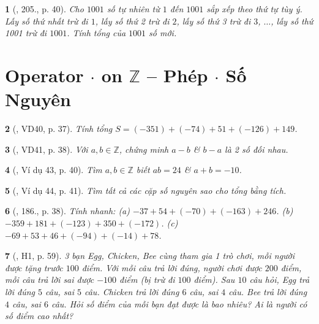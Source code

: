 \documentclass{article}
\newtheorem{baitoan}{}
\begin{document}
\begin{baitoan}[\cite{Tuyen_Toan_6}, 205., p. 40]
	Cho $1001$ số tự nhiên từ $1$ đến $1001$ sắp xếp theo thứ tự tùy ý. Lấy số thứ nhất trừ đi $1$, lấy số thứ 2 trừ đi $2$, lấy số thứ 3 trừ đi $3$, $\ldots$, lấy số thứ 1001 trừ đi $1001$. Tính tổng của $1001$ số mới.
\end{baitoan}


\section{Operator $\cdot$ on $\mathbb{Z}$ -- Phép $\cdot$ Số Nguyên}

\begin{baitoan}[\cite{Tuyen_Toan_6}, VD40, p. 37]
	Tính tổng $S = (-351) + (-74) + 51 + (-126) + 149$.
\end{baitoan}

\begin{baitoan}[\cite{Tuyen_Toan_6}, VD41, p. 38]
	Với $a,b\in\mathbb{Z}$, chứng minh $a - b$ \& $b - a$ là 2 số đối nhau.
\end{baitoan}

\begin{baitoan}[\cite{Tuyen_Toan_6}, Ví dụ 43, p. 40]
	Tìm $a,b\in\mathbb{Z}$ biết $ab = 24$ \& $a + b = -10$.
\end{baitoan}

\begin{baitoan}[\cite{Tuyen_Toan_6}, Ví dụ 44, p. 41]
	Tìm tất cả các cặp số nguyên sao cho tổng bằng tích.
\end{baitoan}

\begin{baitoan}[\cite{Tuyen_Toan_6}, 186., p. 38]
	Tính nhanh: (a) $-37 + 54 + (-70) + (-163) + 246$. (b) $-359 + 181 + (-123) + 350 + (-172)$. (c) $-69 + 53 + 46 + (-94) + (-14) + 78$.
\end{baitoan}

\begin{baitoan}[\cite{Binh_boi_duong_Toan_6_tap_1}, H1, p. 59]
	3 bạn Egg, Chicken, Bee cùng tham gia 1 trò chơi, mỗi người được tặng trước $100$ điểm. Với mỗi câu trả lời đúng, người chơi được $200$ điểm, mỗi câu trả lời sai được $-100$ điểm (bị trừ đi $100$ điểm). Sau $10$ câu hỏi, Egg trả lời đúng $5$ câu, sai $5$ câu. Chicken trả lời đúng $6$ câu, sai $4$ câu. Bee trả lời đúng $4$ câu, sai $6$ câu. Hỏi số điểm của mỗi bạn đạt được là bao nhiêu? Ai là người có số điểm cao nhất?
\end{baitoan}
\end{document}
